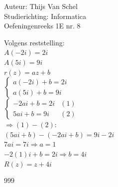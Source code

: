\documentclass[a4paper]{article}
\begin{document}
  
\noindent \large Auteur: Thijs Van Schel \\
\noindent \large Studierichting: Informatica\\
\noindent \large Oefeningenreeks 1E nr. 8\\

\medskip

\normalsize

Volgens reststelling:\\

$A(-2i) = 2i$\\

$A(5i) = 9i$\\

$r(z) = az + b$\\

$\left\{
\begin{array}{l}
a(-2i) + b = 2i \\
a(5i) + b = 9i
\end{array}
\right.$\\

$\left\{
\begin{array}{ll}
-2ai + b = 2i & (1)\\
5ai + b = 9i & (2)
\end{array}
\right.$\\

$\Rightarrow(1) - (2)$:\\

$(5ai + b) - (-2ai + b) = 9i - 2i$\\

$7ai = 7i \Rightarrow a = 1$\\

$-2(1)i + b = 2i \Rightarrow b = 4i$\\

$R(z) = z + 4i$\\


\begin{thebibliography}{999}
\end{thebibliography}
\end{document}
